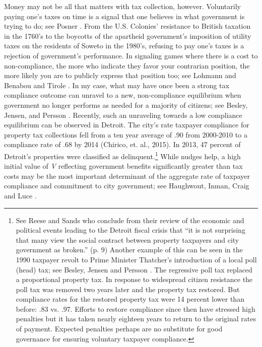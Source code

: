 Money may not be all that matters with tax collection, however.
Voluntarily paying one's taxes on time is a signal that one believes
in what government is trying to do; see Posner
\citeyearpar{Posner-00}. From the
U.S. Colonies' resistance to British taxation in the 1760's to the
boycotts of the apartheid government's imposition of utility taxes on the residents of Soweto in the 1980's, refusing to pay one's
taxes is a rejection of government's performance.  In signaling games where there is a cost to
non-compliance, the more who indicate they favor your contrarian
position, the more likely you are to publicly express that position
too; see Lohmann \citeyearpar{lohmann1994dynamics} and Benabou and Tirole
\citeyearpar{benabou2011laws}.  In my case, what may have once been a
strong tax compliance outcome can unravel to a new, non-compliance
equilibrium when government no longer performs as needed for a majority of citizens; see Besley, Jensen, and Persson
\citeyearpar{besley2015norms}.  Recently, such an unraveling towards a
low compliance equilibrium can be observed in Detroit. The city's rate
taxpayer compliance for property tax collections fell from a ten year
average of .90 from 2000-2010 to a compliance rate of .68 by 2014
(Chirico, et. al., 2015).  In 2013, 47 percent of
Detroit's properties were classified as delinquent.\footnote{See Reese
  and Sands \citeyearpar{reese2013no} who conclude from their review of
  the economic and political events leading to the Detroit fiscal
  crisis that ``it is not surprising that many view the social
  contract between property taxpayers and city government as broken.''
  (p. 9) Another example of this can be seen in the 1990 taxpayer
  revolt to Prime Minister Thatcher's introduction of a local poll
  (head) tax; see Besley, Jensen and Persson
  \citeyearpar{besley2015norms}.  The regressive poll tax replaced a
  proportional property tax.  In response to widespread citizen
  resistance the poll tax was removed two years later and the property
  tax restored.  But compliance rates for the restored property tax
  were 14 percent lower than before: .83 vs. .97.  Efforts to restore
  compliance since then have stressed high penalties but it has taken
  nearly eighteen years to return to the original rates of payment.
  Expected penalties perhaps are no substitute for good governance for
  ensuring voluntary taxpayer compliance.} While nudges help, a high initial value of \textit{V} reflecting government benefits significantly greater than tax costs may be the most important determinant of the aggregate rate of taxpayer compliance and commitment to city government; see Haughwout, Inman, Craig and Luce \citeyearpar{haughwout2004local}.

